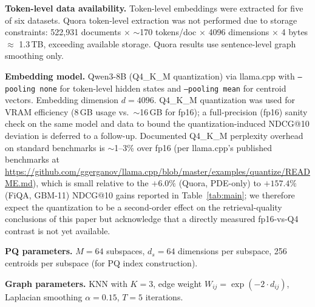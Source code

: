 \documentclass[review,1p]{elsarticle}
\begin{document}
\textbf{Token-level data availability.} Token-level embeddings were extracted for five of six datasets. Quora token-level extraction was not performed due to storage constraints: 522{,}931 documents $\times$ ${\sim}$170 tokens/doc $\times$ 4096 dimensions $\times$ 4 bytes $\approx$ 1.3\,TB, exceeding available storage. Quora results use sentence-level graph smoothing only.

\textbf{Embedding model.} Qwen3-8B (Q4\_K\_M quantization) via llama.cpp with \texttt{--pooling none} for token-level hidden states and \texttt{--pooling mean} for centroid vectors. Embedding dimension $d = 4096$. Q4\_K\_M quantization was used for VRAM efficiency (8\,GB usage vs.\ $\sim$16\,GB for fp16); a full-precision (fp16) sanity check on the same model and data to bound the quantization-induced NDCG@10 deviation is deferred to a follow-up. Documented Q4\_K\_M perplexity overhead on standard benchmarks is $\sim$1--3\% over fp16 (per llama.cpp's published benchmarks at \url{https://github.com/ggerganov/llama.cpp/blob/master/examples/quantize/README.md}), which is small relative to the $+6.0\%$ (Quora, PDE-only) to $+157.4\%$ (FiQA, GBM-11) NDCG@10 gains reported in Table~\ref{tab:main}; we therefore expect the quantization to be a second-order effect on the retrieval-quality conclusions of this paper but acknowledge that a directly measured fp16-vs-Q4 contrast is not yet available.

\textbf{PQ parameters.} $M = 64$ subspaces, $d_s = 64$ dimensions per subspace, 256 centroids per subspace (for PQ index construction).

\textbf{Graph parameters.} KNN with $K = 3$, edge weight $W_{ij} = \exp(-2 \cdot d_{ij})$, Laplacian smoothing $\alpha = 0.15$, $T = 5$ iterations.
\end{document}
